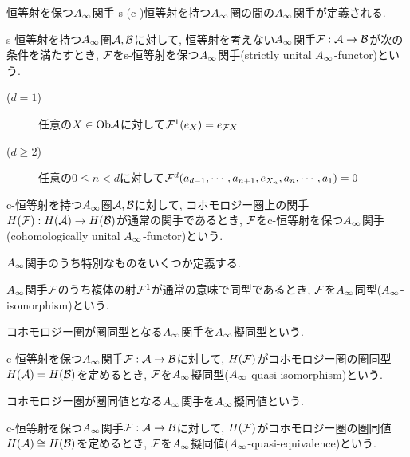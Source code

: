 \documentclass[aspectratio=169, dvipdfmx, 8pt, notheorems, uplatex]{beamer}
\begin{document}
\begin{frame}{恒等射を保つ$\Ainf$関手}
  s-(c-)恒等射を持つ$\Ainf$圏の間の$\Ainf$関手が定義される. 
  
  \begin{definition}
    s-恒等射を持つ$\Ainf$圏$\mathcal{A},\mathcal{B}$に対して, 恒等射を考えない$\Ainf$関手$\mathcal{F} : \mathcal{A} \to \mathcal{B}$が次の条件を満たすとき, $\mathcal{F}$をs-恒等射を保つ$\Ainf$関手(strictly unital $\Ainf$-functor)という. 
    \begin{description}
      \item[($d=1$)] 任意の$X \in \mathrm{Ob}\mathcal{A}$に対して$\mathcal{F}^1(e_X)= e_{\mathcal{F} X}$
      \item[($d \geq 2$)] 任意の$0 \leq n < d$に対して$\mathcal{F}^d(a_{d-1},\cdots,a_{n+1},e_{X_n},a_n,\cdots,a_1) = 0$
    \end{description}
  \end{definition} 
  
  \begin{definition}
    c-恒等射を持つ$\Ainf$圏$\mathcal{A},\mathcal{B}$に対して, コホモロジー圏上の関手$H(\mathcal{F}): H(\mathcal{A}) \to H(\mathcal{B})$が通常の関手であるとき, $\mathcal{F}$をc-恒等射を保つ$\Ainf$関手(cohomologically unital $\Ainf$-functor)という. 
  \end{definition}
\end{frame}

\begin{frame}
  $\Ainf$関手のうち特別なものをいくつか定義する.

  \begin{definition}[$\Ainf$同型]
    $\Ainf$関手$\mathcal{F}$のうち複体の射$\mathcal{F}^1$が通常の意味で同型であるとき, $\mathcal{F}$を$\Ainf$同型($\Ainf$-isomorphism)という. 
  \end{definition} 

  コホモロジー圏が圏同型となる$\Ainf$関手を$\Ainf$擬同型という. 

  \begin{definition}
    c-恒等射を保つ$\Ainf$関手$\mathcal{F} : \mathcal{A} \to \mathcal{B}$に対して, $H(\mathcal{F})$がコホモロジー圏の圏同型$H(\mathcal{A}) = H(\mathcal{B})$を定めるとき, $\mathcal{F}$を$\Ainf$擬同型($\Ainf$-quasi-isomorphism)という. 
  \end{definition} 

  コホモロジー圏が圏同値となる$\Ainf$関手を$\Ainf$擬同値という. 

  \begin{definition}
    c-恒等射を保つ$\Ainf$関手$\mathcal{F} : \mathcal{A} \to \mathcal{B}$に対して, $H(\mathcal{F})$がコホモロジー圏の圏同値$H(\mathcal{A}) \cong H(\mathcal{B})$を定めるとき, $\mathcal{F}$を$\Ainf$擬同値($\Ainf$-quasi-equivalence)という. 
  \end{definition}
\end{frame}
\end{document}
